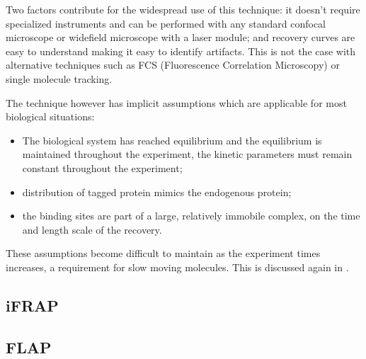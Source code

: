    Two factors contribute for the widespread use of this technique:
    it doesn't require specialized instruments and can be performed with
    any standard confocal microscope or widefield microscope with a laser
    module; and recovery curves are easy to understand making it easy to
    identify artifacts.  This is not the case with alternative techniques
    such as FCS (Fluorescence Correlation Microscopy) or single molecule
    tracking.

    The technique however has implicit assumptions which are applicable
    for most biological situations:

    \begin{itemize}
      \item The biological system has reached equilibrium and the equilibrium
        is maintained throughout the experiment, \ie{} the kinetic parameters
        must remain constant throughout the experiment;

      \item distribution of tagged protein mimics the endogenous protein;

      \item the binding sites are part of a large, relatively immobile
        complex, on the time and length scale of the recovery.
    \end{itemize}

    These assumptions become difficult to maintain as the experiment
    times increases, a requirement for slow moving molecules.  This
    is discussed again in .

  \subsection{iFRAP}


  \subsection{FLAP}
